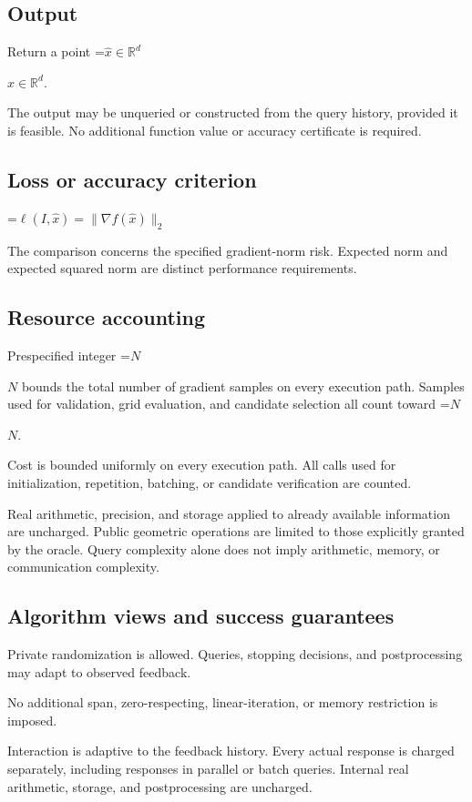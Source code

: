 \documentclass[10pt,a4paper]{article}
\newcommand{\AtlasMath}[1]{\par\begingroup\centering\setbox0=\hbox{$\displaystyle #1$}\ifdim\wd0>1.4\linewidth\typeout{ATLAS WIDE FORMULA: \the\wd0}\fi\ifdim\wd0>\linewidth\resizebox{\linewidth}{!}{\box0}\else\box0\fi\par\endgroup}
\newcommand{\AtlasInlineMath}[1]{\begingroup\setbox0=\hbox{$#1$}\ifdim\wd0>.4\linewidth\endgroup\AtlasMath{#1}\else\endgroup$#1$\fi}
\begin{document}
\subsection{Output}
Return a point \AtlasInlineMath{\widehat x\in\mathbb R^d}.

The output may be unqueried or constructed from the query history, provided it is feasible. No additional function value or accuracy certificate is required.

\subsection{Loss or accuracy criterion}

\AtlasMath{\ell(I,\widehat{x})=\|\nabla f(\widehat{x})\|_2}


The comparison concerns the specified gradient-norm risk. Expected norm and expected squared norm are distinct performance requirements.

\subsection{Resource accounting}
Prespecified integer \AtlasInlineMath{N} bounds the total number of gradient samples on every execution path. Samples used for validation, grid evaluation, and candidate selection all count toward \AtlasInlineMath{N}.

Cost is bounded uniformly on every execution path. All calls used for initialization, repetition, batching, or candidate verification are counted.

Real arithmetic, precision, and storage applied to already available information are uncharged. Public geometric operations are limited to those explicitly granted by the oracle. Query complexity alone does not imply arithmetic, memory, or communication complexity.

\subsection{Algorithm views and success guarantees}
Private randomization is allowed. Queries, stopping decisions, and postprocessing may adapt to observed feedback.

No additional span, zero-respecting, linear-iteration, or memory restriction is imposed.

Interaction is adaptive to the feedback history. Every actual response is charged separately, including responses in parallel or batch queries. Internal real arithmetic, storage, and postprocessing are uncharged.
\end{document}
